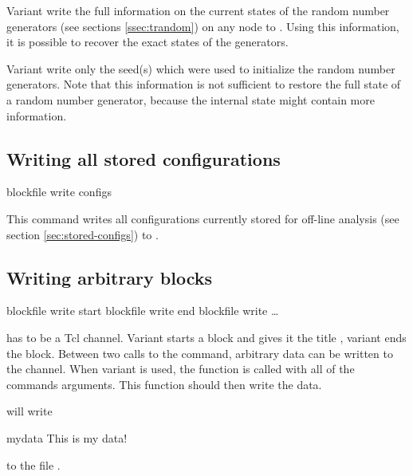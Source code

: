 Variant  write the full information on the
current states of the random number generators (see
sections \vref{ssec:trandom}) on any node to
.  Using this information, it is possible to recover the
exact states of the generators.

Variant  write only the seed(s) which were
used to initialize the random number generators. Note that this
information is not sufficient to restore the full state of a random
number generator, because the internal state might contain more
information.

\subsection{Writing all stored configurations}
\label{sec:blockfile:configs}
\begin{essyntax}
  blockfile  write configs
\end{essyntax}

This command writes all configurations currently stored for off-line
analysis (see section \vref{sec:stored-configs}) to .

\subsection{Writing arbitrary blocks}

\begin{essyntax}
   blockfile  write start 
   blockfile  write end
   blockfile  write  \dots
\end{essyntax}

 has to be a Tcl channel. Variant  starts a
block and gives it the title , variant  ends the
block. Between two calls to the command, arbitrary data can be written
to the channel.  When variant  is used, the function
 is called with all of the commands
arguments. This function should then write the data.


will write 
\begin{tclcode}
{mydata {This is my data!}}
\end{tclcode}
to the file .

